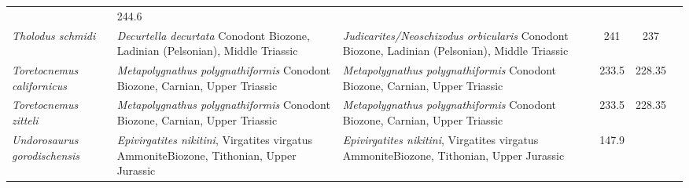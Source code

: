 \begin{longtabu}{>{\itshape}lXXSSl}
                                                             & 244.6
                                                             &
                                                             \cite{Frobisch2013PNAS} \\                   
	Tholodus schmidi                                     & \emph{Decurtella
        decurtata} Conodont Biozone, Ladinian (Pelsonian), Middle Triassic
                                                             &
            \emph{Judicarites/Neoschizodus orbicularis} Conodont Biozone,
            Ladinian (Pelsonian), Middle Triassic
                                                             & 241
                                                             & 237
                                                             &
                                                             \cite{DallaVecchia2004RIPES} \\               
	Toretocnemus californicus                            &
        \emph{Metapolygnathus polygnathiformis} Conodont Biozone, Carnian, Upper
        Triassic                                                  &
        \emph{Metapolygnathus polygnathiformis} Conodont Biozone, Carnian, Upper
        Triassic                                                  & 233.5
                                                                  & 228.35
                                                                  &
                                                                  \cite{Merriam1903UCBDG,McGowan2003HoP} \\        
	Toretocnemus zitteli                                 &
        \emph{Metapolygnathus polygnathiformis} Conodont Biozone, Carnian, Upper
        Triassic                                                  &
        \emph{Metapolygnathus polygnathiformis} Conodont Biozone, Carnian, Upper
        Triassic                                                  & 233.5
                                                                  & 228.35
                                                                  &
                                                                  \cite{Merriam1903UCBDG,McGowan2003HoP} \\        
	Undorosaurus gorodischensis                          &
        \emph{Epivirgatites nikitini}, Virgatites virgatus AmmoniteBiozone,
        Tithonian, Upper Jurassic                                      &
        \emph{Epivirgatites nikitini}, Virgatites virgatus AmmoniteBiozone,
        Tithonian, Upper Jurassic                                      & 147.9

\end{longtabu}
